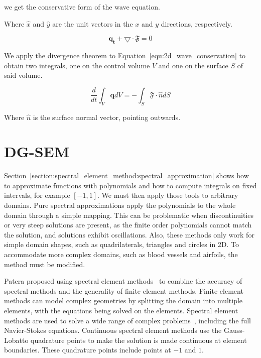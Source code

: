 \noindent
we get the conservative form of the wave equation.

Where $\widehat{x}$ and $\widehat{y}$ are the unit vectors in the $x$ and $y$ directions,
respectively. 

\begin{equation} \label{equ:2d_wave_conservation}
	\mathbf{q_t} + \bigtriangledown \cdot \mathfrak{F} = 0
\end{equation}

We apply the divergence theorem to Equation~\ref{equ:2d_wave_conservation} to obtain two integrals,
one on the control volume $V$ and one on the surface $S$ of said volume.

\begin{equation} \label{equ:2d_wave_integral}
	\frac{d}{dt}\int_{V}\mathbf{q}dV = -\int_{S} \mathfrak{F} \cdot \widehat{n}dS
\end{equation}

\noindent
Where $\widehat{n}$ is the surface normal vector, pointing outwards.

\section{DG-SEM} \label{section:spectral_element_method:dg_sem}

Section~\ref{section:spectral_element_method:spectral_approximation} shows how to approximate
functions with polynomials and how to compute integrals on fixed intervals, for example $\left[ -1,
1 \right]$. We must then apply those tools to arbitrary domains. Pure spectral approximations apply
the polynomials to the whole domain through a simple mapping. This can be problematic when
discontinuities or very steep solutions are present, as the finite order polynomials cannot match
the solution, and solutions exhibit oscillations. Also, these methods only work for simple domain
shapes, such as quadrilaterals, triangles and circles in 2D. To accommodate more complex domains,
such as blood vessels and airfoils, the method must be modified.

Patera proposed using spectral element methods~\cite{Patera1984} to combine the accuracy of spectral
methods and the generality of finite element methods. Finite element methods can model complex
geometries by splitting the domain into multiple elements, with the equations being solved on the
elements. Spectral element methods are used to solve a wide range of complex
problems~\cite{Deville2003}, including the full Navier-Stokes equations. Continuous spectral element
methods use the Gauss-Lobatto quadrature points to make the solution is made continuous at element
boundaries. These quadrature points include points at $-1$ and $1$.

